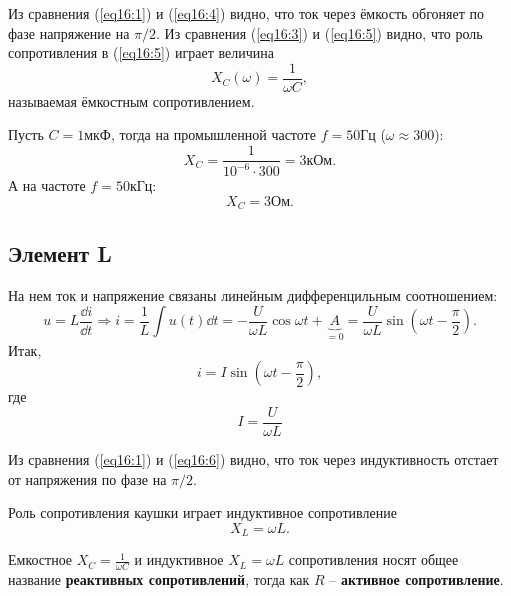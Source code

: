         Из сравнения (\ref{eq16:1}) и (\ref{eq16:4}) видно, что ток через
        ёмкость обгоняет по фазе напряжение на \( \pi/2 \). Из сравнения
        (\ref{eq16:3}) и  (\ref{eq16:5}) видно, что роль сопротивления в
        (\ref{eq16:5}) играет величина
        \[
            X_C(\omega) = \frac{1}{\omega C},
        \]
        называемая ёмкостным сопротивлением.
        
        \begin{example}
            Пусть \( C = 1 \)мкФ, тогда на промышленной частоте \( f = 50 \)Гц
            (\( \omega \approx 300 \)):
            \[
                X_C = \frac{1}{10^{-6}\cdot300} = 3 \text{кОм}.
            \]
            А на частоте \( f = 50 \)кГц:
            \[
                X_C = 3 \text{Ом}.
            \]
        \end{example}
        
    \subsection{Элемент L}
        На нем ток и напряжение связаны линейным дифференцильным соотношением:
        \[
            u = L\frac{\dd i}{\dd t} \Rightarrow i =
            \frac{1}{L}\int u(t)\dd t = -\frac{U}{\omega L}\cos\omega t +
            \underbrace{A}_{=0} = \frac{U}{\omega L}\sin\left(\omega t -
            \frac{\pi}{2}\right).
        \]
        Итак,
        \begin{equation}
            i = I\sin\left(\omega t - \frac{\pi}{2}\right),
            \label{eq16:6}
        \end{equation}
        где
        \begin{equation}
            I = \frac{U}{\omega L} \label{eq16:7}
        \end{equation}
        
        Из сравнения (\ref{eq16:1}) и (\ref{eq16:6}) видно, что ток через
        индуктивность отстает от напряжения по фазе на \( \pi/2 \).
        
        Роль сопротивления каушки играет индуктивное сопротивление
        \[
            X_L = \omega L.
        \]
        
        \begin{remark}
            Емкостное \( X_C = \frac{1}{\omega C} \) и индуктивное
            \( X_L = \omega L \) сопротивления носят общее название
            \textbf{реактивных сопротивлений}, тогда как \( R \) --
            \textbf{активное сопротивление}.
        \end{remark}

